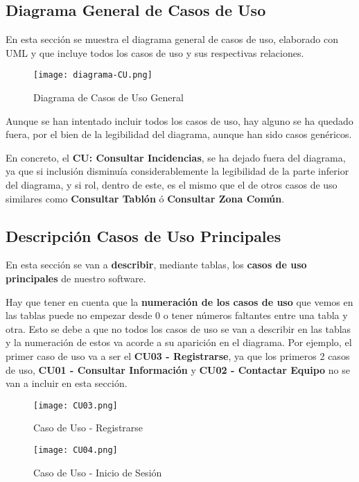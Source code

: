 \subsection{Diagrama General de Casos de Uso}
En esta sección se muestra el diagrama general de casos de uso, elaborado con UML y que incluye todos los casos de uso y sus respectivas relaciones.

\begin{figure}[H]
	\centering
	\texttt{[image: diagrama-CU.png]}
	\caption{Diagrama de Casos de Uso General}
\end{figure}

Aunque se han intentado incluir todos los casos de uso, hay alguno se ha quedado fuera, por el bien de la legibilidad del diagrama, aunque han sido casos genéricos. 

En concreto, el \textbf{CU: Consultar Incidencias}, se ha dejado fuera del diagrama, ya que si inclusión disminuía considerablemente la legibilidad de la parte inferior del diagrama, y si rol, dentro de este, es el mismo que el de otros casos de uso similares como \textbf{Consultar Tablón} ó \textbf{Consultar Zona Común}.

\subsection{Descripción Casos de Uso Principales}
En esta sección se van a \textbf{describir}, mediante tablas, los \textbf{casos de uso principales} de nuestro software. 

Hay que tener en cuenta que la \textbf{numeración de los casos de uso} que vemos en las tablas puede no empezar desde 0 o tener números faltantes entre una tabla y otra. Esto se debe a que no todos los casos de uso se van a describir en las tablas y la numeración de estos va acorde a su aparición en el diagrama. Por ejemplo, el primer caso de uso va a ser el \textbf{CU03 - Registrarse}, ya que los primeros 2 casos de uso, \textbf{CU01 - Consultar Información} y \textbf{CU02 - Contactar Equipo} no se van a incluir en esta sección.

\begin{figure}[H]
	\centering
	\texttt{[image: CU03.png]}
	\caption{Caso de Uso - Registrarse}
\end{figure}

\begin{figure}[H]
	\centering
	\texttt{[image: CU04.png]}
	\caption{Caso de Uso - Inicio de Sesión}
\end{figure}

